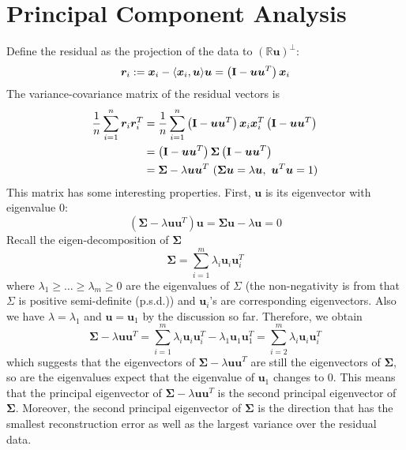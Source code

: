 \documentclass[../book-template.tex]{subfiles}
\begin{document}
\section{Principal Component Analysis}
Define the residual as the projection of the data to $(\mathbb{R}\bm{u})^{\bot}$:
\begin{equation*}
    \bm{r}_i:=\bm{x}_i - \langle\bm{x}_i,\bm{u}  \rangle\bm{u} = \left({\bf I} - \bm{uu}^T \right)\bm{x}_i
\end{equation*}
The variance-covariance matrix of the residual vectors is
\begin{align*}
    \frac{1}{n}\sum_{i=1}^n \bm{r}_i\bm{r}_i^T &=  \frac{1}{n}\sum_{i=1}^n \left({\bf I} - \bm{uu}^T \right)\bm{x}_i\bm{x}_i^T\left({\bf I} - \bm{uu}^T \right)\\
    &= \left({\bf I} - \bm{uu}^T \right)\bm{\Sigma}\left({\bf I} - \bm{uu}^T \right)\\
    &=\bm{\Sigma} - \lambda\bm{uu}^T\ (\bm{\Sigma u}=\lambda \bm{u},\ \bm{u}^T\bm{u}=1)
\end{align*}
This matrix has some interesting properties. First, $\bm{u}$ is its eigenvector with eigenvalue $0$:
\begin{equation*}
    \left(\bm{\Sigma} - \lambda\bm{uu}^T\right)\bm{u} = \bm{\Sigma u}-\lambda \bm{u}=0
\end{equation*}
Recall the eigen-decomposition of $\bm{\Sigma}$
\begin{equation}\label{eq_2_edom}
    \bm{\Sigma} = \sum_{i=1}^m \lambda_i\bm{u}_i\bm{u}_i^T
\end{equation}
where $\lambda_1\geq\dots\geq\lambda_m\geq 0$ are the eigenvalues of $\Sigma$ (the non-negativity is from that $\Sigma$ is positive semi-definite (p.s.d.)) and $\bm{u}_i$'s are corresponding eigenvectors. Also we have $\lambda = \lambda_1$ and $\bm{u}=\bm{u}_1$ by the discussion so far. Therefore, we obtain
\begin{equation*}
    \bm{\Sigma} - \lambda\bm{uu}^T = \sum_{i=1}^m \lambda_i\bm{u}_i\bm{u}_i^T - \lambda_1\bm{u}_1\bm{u}_1^T = \sum_{i=2}^m \lambda_i\bm{u}_i\bm{u}_i^T
\end{equation*}
which suggests that the eigenvectors of $\bm{\Sigma} - \lambda\bm{uu}^T$ are still the eigenvectors of $\bm{\Sigma}$, so are the eigenvalues expect that the eigenvalue of $\bm{u}_1$ changes to $0$. This means that the principal eigenvector of $\bm{\Sigma} - \lambda\bm{uu}^T$ is the second principal eigenvector of $\bm{\Sigma}$. Moreover, the second principal eigenvector of $\bm{\Sigma}$ is the direction that has the smallest reconstruction error as well as the largest variance over the residual data.
\end{document}
